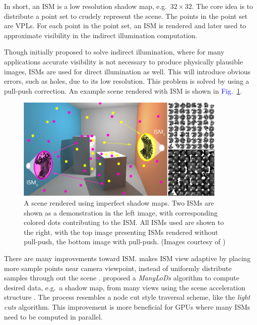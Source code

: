 \documentclass[]{book}
\renewcommand{\figurename}{\textcolor{blue}{Fig.\ }}
\begin{document}
In short, an ISM is a low resolution shadow map, e.g.\ $32\times 32$.
The core idea is to distribute a point set to crudely represent the scene.
The points in the point set are VPLs.
For each point in the point set, an ISM is rendered and later used to approximate visibility in the indirect illumination computation.

Though initially proposed to solve indirect illumination, where for many applications accurate visibility is not necessary to produce physically plausible images, ISMs are used for direct illumination as well.
This will introduce obvious errors, such as holes, due to its low resolution.
This problem is solved by using a pull-push correction.
An example scene rendered with ISM is shown in \figurename \ref{fig:VC:ISM}.

\begin{figure}
	\centering
	\includegraphics[width=4.0in]{img/VC-3-ISM.png}
	\caption[Imperfect Shadow Maps]{A scene rendered using imperfect shadow maps. Two ISMs are shown as a demonstration in the left image, with corresponding colored dots contributing to the ISM. All ISMs used are shown to the right, with the top image presenting ISMs rendered without pull-push, the bottom image with pull-push. (Images courtesy of \citeauthor{ritschel2008ISM})}
	\label{fig:VC:ISM}
\end{figure}

There are many improvements toward ISM.
\citeauthor{ritschel2011making} makes ISM view adaptive by placing more sample points near camera viewpoint, instead of uniformly distribute samples through out the scene \cite{ritschel2011making}.
\citeauthor{hollander2011ManyLODs} proposed a \textit{ManyLoDs} algorithm to compute desired data, e.g.\ a shadow map, from many views using the scene acceleration structure \cite{hollander2011ManyLODs}.
The process resembles a node cut style traversal scheme, like the \textit{light cuts} algorithm.
This improvement is more beneficial for GPUs where many ISMs need to be computed in parallel.
\end{document}
